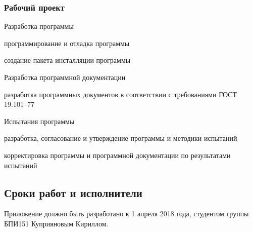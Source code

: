 \subsubsection{Рабочий проект}
\begin{my_enumerate}
    \item Разработка программы
        \begin{my_enumerate}
            \item программирование и отладка программы
            \item создание пакета инсталляции программы
        \end{my_enumerate}
    \item Разработка программной документации
        \begin{my_enumerate}
            \item разработка программных документов в соответствии с
                требованиями ГОСТ 19.101--77
        \end{my_enumerate}
     \item Испытания программы
           \begin{my_enumerate}
             \item разработка, согласование и утверждение программы и методики испытаний
            \item корректировка программы и программной документации по результатами испытаний
         \end{my_enumerate}
\end{my_enumerate}

\subsection{Сроки работ и исполнители}

Приложение должно быть разработано к 1 апреля 2018 года, студентом группы БПИ151
Куприяновым Кириллом.



